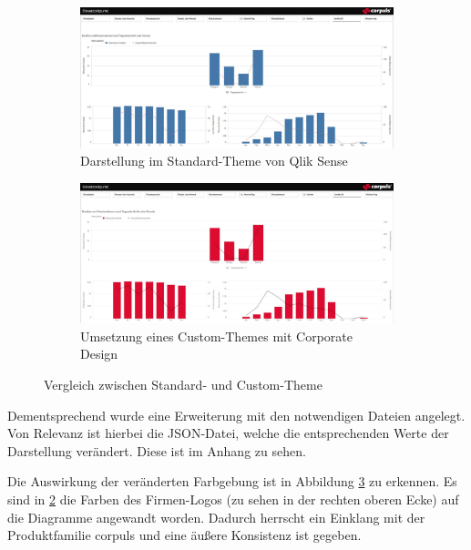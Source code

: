 \begin{figure}[ht]
\centering
\begin{subfigure}{1\linewidth}
  \centering
  \includegraphics[width=1\linewidth]{img/beforeCT}  
  \caption{Darstellung im Standard-Theme von Qlik Sense}
  \label{fig:beforeCT}
\end{subfigure}
\begin{subfigure}{1\linewidth}
  \centering
  \includegraphics[width=1\linewidth]{img/afterCT}  
  \caption{Umsetzung eines Custom-Themes mit Corporate Design}
  \label{fig:afterCT}
\end{subfigure}
\caption[Vergleich zwischen Standard- und Custom-Theme]{Vergleich zwischen Standard- und Custom-Theme}
\label{fig:custom}
\end{figure}

Dementsprechend wurde eine Erweiterung mit den notwendigen Dateien angelegt.
Von Relevanz ist hierbei die JSON-Datei, welche die entsprechenden Werte der Darstellung verändert.
Diese ist im Anhang  zu sehen.

Die Auswirkung der veränderten Farbgebung ist in Abbildung \ref{fig:custom} zu erkennen. 
Es sind in \ref{fig:afterCT} die Farben des Firmen-Logos (zu sehen in der rechten oberen Ecke) auf die Diagramme angewandt worden.
Dadurch herrscht ein Einklang mit der Produktfamilie \textsf{corpuls\color{corpulsred}{.web}} und eine äußere Konsistenz ist gegeben.



